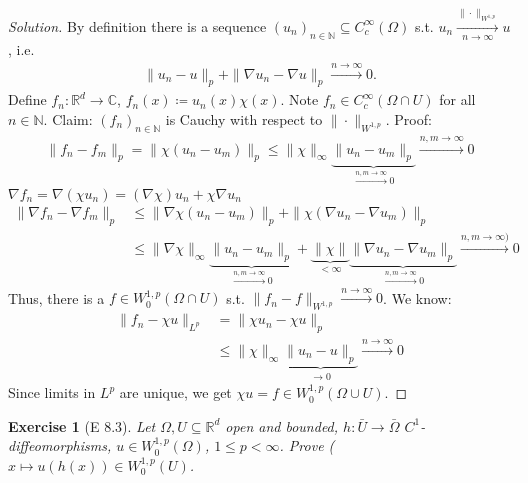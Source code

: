 \documentclass{report}
\theoremstyle{tommy}
\newtheorem{ex}[defn]{Exercise}
\begin{document}
  \begin{proof}[Solution]
    By definition there is a sequence \((u_n)_{n \in \mathbb{N}} \subseteq C_c^\infty(\Omega)\) s.t. \(u_n \xrightarrow[n \to \infty]{\|\cdot\|_{W^{1,p}}} u\) , i.e.
    \begin{align*}
      \|u_n - u\|_p + \|\nabla u_n - \nabla u \|_{p} \xrightarrow{n \to \infty} 0.
    \end{align*}
    Define \(f_n: \mathbb{R}^d \to \mathbb{C}\), \(f_n(x) \coloneqq u_n(x) \chi(x)\). Note \(f_n \in C_c^\infty (\Omega \cap U)\) for all \(n \in \mathbb{N}\). Claim: \((f_n)_{n \in \mathbb{N}}\) is Cauchy with respect to \(\|\cdot \|_{W^{1,p}}\). Proof: 
    \begin{align*}
      \|f_n - f_m\|_p = \|\chi(u_n - u_m)\|_p \le \|\chi\|_\infty \underbrace{\|u_n - u_m\|_p}_{\xrightarrow{n,m \to \infty} 0} \xrightarrow{n,m \to \infty} 0 
    \end{align*}
    \(\nabla f_n = \nabla (\chi u_n) = (\nabla \chi) u_n + \chi \nabla u_n\)
    \begin{align*}
      \|\nabla f_n - \nabla f_m\|_p 
      &\le \|\nabla \chi(u_n - u_m)\|_p + \|\chi(\nabla u_n - \nabla u_m)\|_p \\
      &\le \|\nabla \chi\|_\infty \underbrace{\|u_n - u_m\|_p}_{\xrightarrow{n,m \to \infty} 0} + \underbrace{\|\chi\|}_{< \infty} \underbrace{\|\nabla u_n - \nabla u_m\|_p}_{\xrightarrow{n,m \to \infty}0}\xrightarrow{n,m \to \infty)} 0
    \end{align*}
    Thus, there is a \(f \in W_0^{1,p}(\Omega \cap U)\) s.t. \(\|f_n - f\|_{W^{1,p}} \xrightarrow{n \to \infty} 0\). We know:
    \begin{align*}
      \|f_n - \chi u\|_{L^p} &= \|\chi u_n - \chi u\|_p \\
      &\le \|\chi\|_\infty \underbrace{\|u_n - u\|_p}_{\to 0} \xrightarrow{n \to \infty} 0
    \end{align*}
    Since limits in \(L^p\) are unique, we get \(\chi u = f \in W_0^{1,p}(\Omega \cup U)\).
  \end{proof}

  \begin{ex}[E 8.3]
    Let \(\Omega, U \subseteq \mathbb{R}^d\) open and bounded, \(h: \bar U \to \bar \Omega\) \(C^1\)-diffeomorphisms, \(u \in W_0^{1,p}(\Omega)\), \(1 \le p < \infty\). Prove (\(x \mapsto u(h(x)) \in W_0^{1,p}(U)\).
  \end{ex}
  
\end{document}
